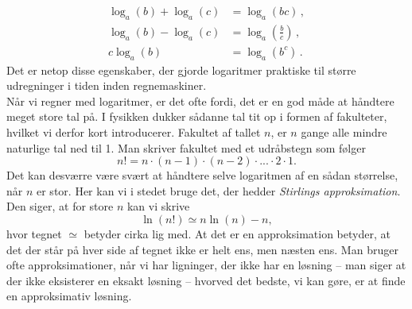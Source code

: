 \begin{subequations}
\label{mat:eq:log}
\begin{align}
    \log_a(b)+\log_a(c)&=\log_a(bc) \, ,\label{mat:log:plus}\\
    \log_a(b)-\log_a(c)&=\log_a\left(\frac{b}{c}\right)\,,\label{mat:log:minus}\\
    c\log_a(b)&=\log_a(b^c)\, .\label{mat:log:gange}
\end{align}
\end{subequations}
Det er netop disse egenskaber, der gjorde logaritmer praktiske til større udregninger i tiden inden regnemaskiner. \\

Når vi regner med logaritmer, er det ofte fordi, det er en god måde at håndtere meget store tal på. I fysikken dukker sådanne tal tit op i formen af fakulteter, hvilket vi derfor kort introducerer. 
Fakultet af tallet $n$, er $n$ gange alle mindre naturlige tal ned til 1.
Man skriver fakultet med et udråbstegn som følger
\begin{equation} \label{mat:eq:fakultet}
    n!=n\cdot(n-1)\cdot(n-2)\cdot ...\cdot 2\cdot 1.
\end{equation}
Det kan desværre være svært at håndtere selve logaritmen af en sådan størrelse, når $n$ er stor.
Her kan vi i stedet bruge det, der hedder {\em Stirlings approksimation}.
Den siger, at for store $n$ kan vi skrive
%
\begin{equation}
    \ln(n!) \simeq n\ln(n)-n,
\end{equation}
%
hvor tegnet $\simeq$ betyder cirka lig med. At det er en approksimation betyder, at det der står på hver side af tegnet ikke er helt ens, men næsten ens. Man bruger ofte approksimationer, når vi har ligninger, der ikke har en løsning -- man siger at der ikke eksisterer en eksakt løsning --  hvorved det bedste, vi kan gøre, er at finde en approksimativ løsning. %

